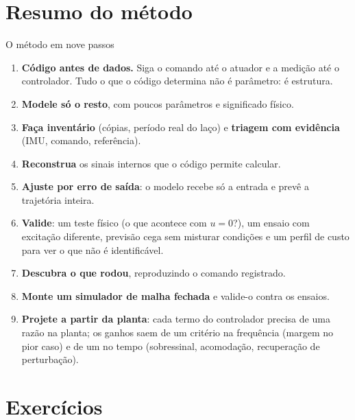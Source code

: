 \documentclass[11pt,a4paper,oneside,openany]{book}
\begin{document}
\section{Resumo do método}

\begin{caixa}{O método em nove passos}
\begin{enumerate}\itemsep1pt
  \item \textbf{Código antes de dados.} Siga o comando até o atuador e a medição até o
    controlador. Tudo o que o código determina não é parâmetro: é estrutura.
  \item \textbf{Modele só o resto}, com poucos parâmetros e significado físico.
  \item \textbf{Faça inventário} (cópias, período real do laço) e \textbf{triagem com
    evidência} (IMU, comando, referência).
  \item \textbf{Reconstrua} os sinais internos que o código permite calcular.
  \item \textbf{Ajuste por erro de saída}: o modelo recebe só a entrada e prevê a
    trajetória inteira.
  \item \textbf{Valide}: um teste físico (o que acontece com $u = 0$?), um ensaio com
    excitação diferente, previsão cega sem misturar condições e um perfil de custo para
    ver o que não é identificável.
  \item \textbf{Descubra o que rodou}, reproduzindo o comando registrado.
  \item \textbf{Monte um simulador de malha fechada} e valide-o contra os ensaios.
  \item \textbf{Projete a partir da planta}: cada termo do controlador precisa de uma
    razão na planta; os ganhos saem de um critério na frequência (margem no pior caso) e
    de um no tempo (sobressinal, acomodação, recuperação de perturbação).
\end{enumerate}
\end{caixa}

\section{Exercícios}
\end{document}
